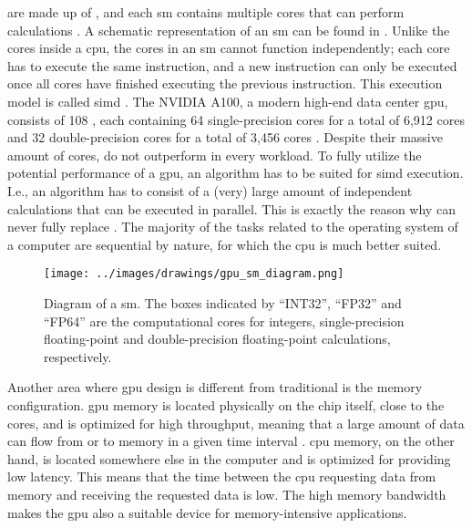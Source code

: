  are made up of , and each \acrshort{sm} contains multiple cores that can perform calculations \citep{rauberParallelProgrammingMulticore2023}. A schematic representation of an \acrshort{sm} can be found in . Unlike the cores inside a \acrshort{cpu}, the cores in an \acrshort{sm} cannot function independently; each core has to execute the same instruction, and a new instruction can only be executed once all cores have finished executing the previous instruction. This execution model is called \acrfull{simd} \citep{flynnVeryHighspeedComputing1966}. The NVIDIA A100, a modern high-end data center \acrshort{gpu}, consists of 108 , each containing 64 single-precision cores for a total of 6,912 cores and 32 double-precision cores for a total of 3,456 cores \citep{nvidiaNVIDIAA100Tensor2020}. Despite their massive amount of cores,  do not outperform  in every workload. To fully utilize the potential performance of a \acrshort{gpu}, an algorithm has to be suited for \acrshort{simd} execution. I.e., an algorithm has to consist of a (very) large amount of independent calculations that can be executed in parallel. This is exactly the reason why  can never fully replace . The majority of the tasks related to the operating system of a computer are sequential by nature, for which the \acrshort{cpu} is much better suited.

\begin{figure}
    \centering
    \texttt{[image: ../images/drawings/gpu\_sm\_diagram.png]}
    \caption{Diagram of a \acrfull{sm}. The boxes indicated by ``INT32'', ``FP32'' and ``FP64'' are the computational cores for integers, single-precision floating-point and double-precision floating-point calculations, respectively. \citep{rauberParallelProgrammingMulticore2023}}
    \label{fig:gpu_sm_diagram}
\end{figure}

Another area where \acrshort{gpu} design is different from traditional  is the memory configuration. \acrshort{gpu} memory is located physically on the chip itself, close to the cores, and is optimized for high throughput, meaning that a large amount of data can flow from or to memory in a given time interval \citep{aamondtGeneralPurposeGraphicsProcessing2018}. \acrshort{cpu} memory, on the other hand, is located somewhere else in the computer and is optimized for providing low latency. This means that the time between the \acrshort{cpu} requesting data from memory and receiving the requested data is low. The high memory bandwidth makes the \acrshort{gpu} also a suitable device for memory-intensive applications.

